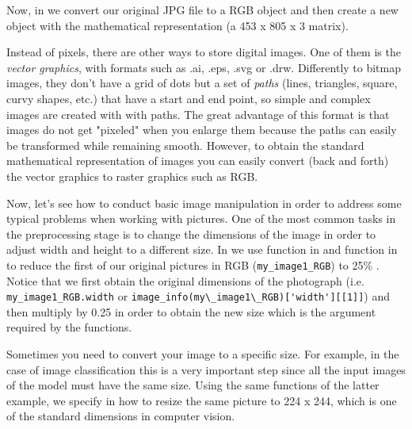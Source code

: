 Now, in  we convert our original JPG file to a RGB object and then create a new object with the mathematical representation (a 453 x 805 x 3 matrix).


Instead of pixels, there are other ways to store digital images. One of them is the \textit{vector graphics}, with formats such as .ai, .eps, .svg or .drw. Differently to bitmap images, they don't have a grid of dots but a set of \textit{paths} (lines, triangles, square, curvy shapes, etc.) that have a start and end point, so simple and complex images are created with with paths. The great advantage of this format is that images do not get "pixeled" when you enlarge them because the paths can easily be transformed 	while remaining smooth. However, to obtain the standard mathematical representation of images you can easily convert (back and forth) the vector graphics to raster graphics such as RGB.

Now, let's see how to conduct basic image manipulation in order to address some typical problems when working with pictures. One of the most common tasks in the preprocessing stage is to change the dimensions of the image in order to adjust width and height to a different size. In  we use  function in  and  function in  to reduce the first of our original pictures in RGB (\texttt{my\_image1\_RGB}) to 25\% . Notice that we first obtain the original dimensions of the photograph (i.e. \texttt{my\_image1\_RGB.width} or \verb|image_info(my\_image1\_RGB)['width'][[1]]|) and then multiply by 0.25 in order to obtain the new size which is the argument required by the functions.


Sometimes you need to convert your image to a specific size. For example, in the case of image classification this is a very important step since all the input images of the model must have the same size. Using the same functions of the latter example, we specify in  how to resize the same picture to 224 x 244, which is one of the standard dimensions in computer vision. 


